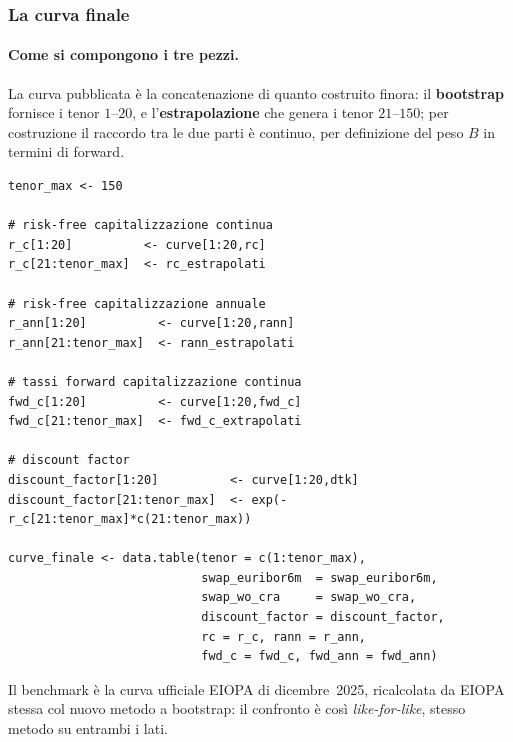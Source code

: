 \documentclass[11pt,a4paper]{article}
\theoremstyle{plain}
\theoremstyle{definition}
\theoremstyle{remark}
\begin{document}
\subsubsection{La curva finale}
\label{sec:curva-finale}

\paragraph{Come si compongono i tre pezzi.}
La curva pubblicata \`e la concatenazione di quanto costruito finora: il \textbf{bootstrap}
fornisce i tenor $1$--$20$, e
l'\textbf{estrapolazione} che genera i tenor $21$--$150$; per costruzione il raccordo tra le due parti è continuo, per definizione del peso $B$ in termini di forward.

\begin{codebox}
\begin{Verbatim}[fontsize=\small]
tenor_max <- 150

# risk-free capitalizzazione continua
r_c[1:20]          <- curve[1:20,rc]
r_c[21:tenor_max]  <- rc_estrapolati

# risk-free capitalizzazione annuale
r_ann[1:20]          <- curve[1:20,rann]
r_ann[21:tenor_max]  <- rann_estrapolati

# tassi forward capitalizzazione continua
fwd_c[1:20]          <- curve[1:20,fwd_c]
fwd_c[21:tenor_max]  <- fwd_c_extrapolati

# discount factor
discount_factor[1:20]          <- curve[1:20,dtk]
discount_factor[21:tenor_max]  <- exp(-r_c[21:tenor_max]*c(21:tenor_max))

curve_finale <- data.table(tenor = c(1:tenor_max),
                           swap_euribor6m  = swap_euribor6m,
                           swap_wo_cra     = swap_wo_cra,
                           discount_factor = discount_factor,
                           rc = r_c, rann = r_ann,
                           fwd_c = fwd_c, fwd_ann = fwd_ann)
\end{Verbatim}
\end{codebox}

Il benchmark \`e la curva ufficiale EIOPA di dicembre~2025, ricalcolata da EIOPA stessa col
nuovo metodo a bootstrap: il confronto \`e cos\`i \emph{like-for-like}, stesso metodo su
entrambi i lati.


\end{document}
